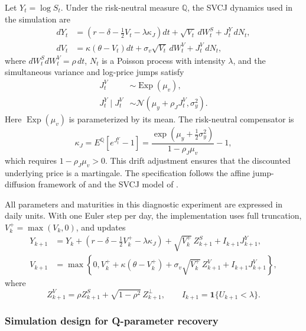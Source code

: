 Let $Y_t=\log S_t$. Under the risk-neutral measure $\mathbb{Q}$, the SVCJ
dynamics used in the simulation are
\begin{align}
dY_t
&=\left(r-\delta-\frac{1}{2}V_t-\lambda\kappa_J\right)dt
  +\sqrt{V_t}\,dW_t^S+J_t^Y\,dN_t,
\label{eq:q_svcj_log_price}\\
dV_t
&=\kappa(\theta-V_t)dt
  +\sigma_v\sqrt{V_t}\,dW_t^V+J_t^V\,dN_t,
\label{eq:q_svcj_variance}
\end{align}
where $dW_t^S dW_t^V=\rho\,dt$, $N_t$ is a Poisson process with
intensity $\lambda$, and the simultaneous variance and log-price jumps satisfy
\begin{align}
J_t^V&\sim\operatorname{Exp}(\mu_v),\\
J_t^Y\mid J_t^V&\sim
\mathcal{N}\!\left(\mu_y+\rho_JJ_t^V,\sigma_y^2\right).
\end{align}
Here $\operatorname{Exp}(\mu_v)$ is parameterized by its mean. The
risk-neutral compensator is
\begin{equation}
\kappa_J
=E^{\mathbb{Q}}\!\left[e^{J_t^Y}-1\right]
=\frac{\exp(\mu_y+\tfrac{1}{2}\sigma_y^2)}
       {1-\rho_J\mu_v}-1,
\label{eq:q_svcj_jump_compensator}
\end{equation}
which requires $1-\rho_J\mu_v>0$. This drift adjustment ensures that the
discounted underlying price is a martingale. The specification follows the
affine jump-diffusion framework of \citet{DuffiePanSingleton2000} and the SVCJ
model of \citet{ErakerJohannesPolson2003}.

All parameters and maturities in this diagnostic experiment are expressed in
daily units. With one Euler step per day, the implementation uses full
truncation, $V_k^+=\max(V_k,0)$, and updates
\begin{align}
Y_{k+1}
&=Y_k+\left(r-\delta-\frac{1}{2}V_k^+
            -\lambda\kappa_J\right)
  +\sqrt{V_k^+}\,Z_{k+1}^S+I_{k+1}J_{k+1}^Y,
\label{eq:q_svcj_euler_log_price}\\
V_{k+1}
&=\max\left\{0,
  V_k^++\kappa(\theta-V_k^+)
  +\sigma_v\sqrt{V_k^+}\,Z_{k+1}^V
  +I_{k+1}J_{k+1}^V\right\},
\label{eq:q_svcj_euler_variance}
\end{align}
where
\begin{equation}
Z_{k+1}^V=\rho Z_{k+1}^S
          +\sqrt{1-\rho^2}\,Z_{k+1}^{\perp},
\qquad
I_{k+1}=\mathbf{1}\{U_{k+1}<\lambda\}.
\end{equation}

\subsubsection{Simulation design for Q-parameter recovery}
\label{subsec:q_parameter_recovery_simulation}

